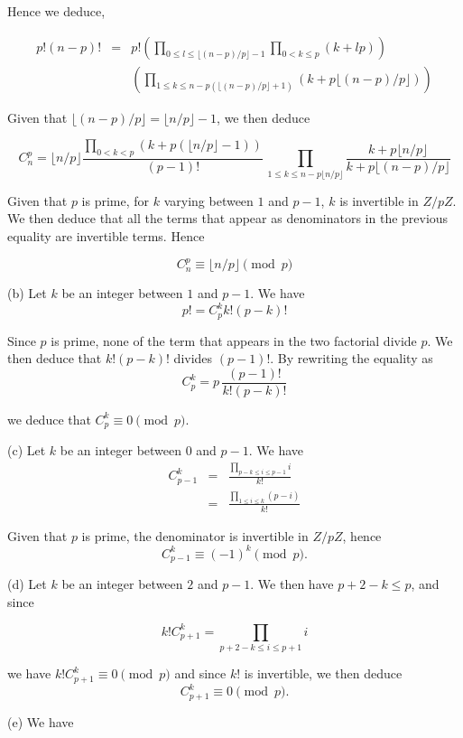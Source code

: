\documentclass[a4paper,12pt]{article}
\newcommand{\subpar}[1]{\medskip \noindent (#1)}
\begin{document}
Hence we deduce,

\begin{eqnarray*}
  p!(n-p)! &=& p! \left( \prod_{0\le l \le \lfloor (n-p)/p\rfloor-1}
  \prod_{0<k\le p} (k+lp)\right) \\ &&
  \left( \prod_{1\le k\le n-p(\lfloor (n-p)/p\rfloor+1)} (k + p \lfloor
  (n-p)/p\rfloor)\right)
\end{eqnarray*}

Given that $\lfloor (n-p)/p \rfloor = \lfloor n/p\rfloor - 1$, we then
deduce


\[  C_n^p = \lfloor n/p\rfloor \frac{\prod_{0< k < p}(k + p(\lfloor
    n/p\rfloor - 1))}{(p-1)!}\,
  \prod_{1\le k\le n-p\lfloor n/p\rfloor }
  \frac{k+p\lfloor n/p\rfloor}{k+p\lfloor (n-p)/p\rfloor} \]

Given that $p$ is prime, for $k$ varying between $1$ and $p-1$, $k$ is
invertible in $Z/pZ$. We then deduce that all the terms that appear as
denominators in the previous equality are invertible terms.  Hence

\[ C_n^p \equiv \lfloor n/p\rfloor \pmod p\]

\subpar{b} Let $k$ be an integer between $1$ and $p-1$.  We have
\[ p! = C_p^k k! (p-k)! \]

Since $p$ is prime, none of the term that appears in the two
factorial divide $p$.  We then deduce that $k! (p-k)!$ divides
$(p-1)!$. By rewriting the equality as
\[ C_p^k = p\,\frac{(p-1)!}{k!(p-k)!}\]

we deduce that $C_p^k \equiv 0 \pmod p$.

\subpar{c} Let $k$ be an integer between $0$ and $p-1$. We have
\begin{eqnarray*}
  C_{p-1}^k &=& \frac{\prod_{p-k \le i\le p-1} i}{k!} \\
  &=& \frac{\prod_{1\le i\le k} (p-i)}{k!}
\end{eqnarray*}

Given that $p$ is prime, the denominator is invertible in $Z/pZ$,
hence
\[ C_{p-1}^k \equiv (-1)^k \pmod p.\]

\subpar{d} Let $k$ be an integer between $2$ and $p-1$. We then have $p+2-k
\le p$, and since

\[  k!C_{p+1}^k = \prod_{p+2-k\le i\le p+1} i \]

we have $k! C_{p+1}^k \equiv 0 \pmod p$ and since $k!$ is invertible, we
then deduce
\[ C_{p+1}^k \equiv 0 \pmod p.\]

\subpar{e} We have
\end{document}
